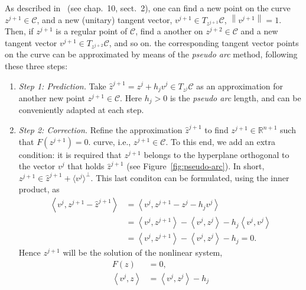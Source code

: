 \documentclass[11pt,reqno,twoside]{article}
\newcommand{\R}{\ensuremath{\mathbb{R}}}
\theoremstyle{remark}
\begin{document}
As described in~\cite{Kuznetsov2004} (see chap.~10, sect.~2), one can
find a new point on the curve $z^{j+1}\in\mathcal{C}$, and a new (unitary) tangent
vector, $v^{j+1}\in T_{z^{j+1}}\mathcal{C}$, $\left\|v^{j+1}\right\| = 1$.
Then, if $z^{j+1}$ is a
regular point of $\mathcal{C}$, find a another on $z^{j+2}\in\mathcal{C}$
and a new tangent vector $v^{j+1}\in T_{z^{j+2}}\mathcal{C}$, and so on.   
the corresponding tangent vector
points on the curve can be approximated by means of the \emph{pseudo arc} method, following
these three steps:
\begin{enumerate}[label = \emph{\arabic*.}]
  \item \emph{Step 1: Prediction.} Take $\hat{z}^{j+1} = z^{j} + h_{j}
    v^{j}\in T_{z^{j}}\mathcal{C}$ as an approximation for another new
    point $z^{j+1}\in\mathcal{C}$. Here $h_{j} > 0$ is the \emph{pseudo
    arc} length, and can be conveniently adapted at each step.
  \item \emph{Step 2: Correction.} Refine the approximation $\hat{z}^{j+1}$
    to find $z^{j+1}\in\R^{n+1}$ such that $F\left(z^{j+1}\right) = 0$. 
    curve, i.e., $z^{j+1}\in\mathcal{C}$. To this end, we add an 
    extra condition: 
    it is required that $z^{j+1}$ belongs to
    the hyperplane orthogonal to the vector $v^{j}$ that holds
    $\hat{z}^{j+1}$ (see Figure~\ref{fig:pseudo-arc}). In short, $z^{j+1}\in\hat{z}^{j+1} +
    \langle v^{j}\rangle^{\perp}$. This last conditon can be formulated,
    using the inner product, as
    \begin{align*}
      \left\langle v^{j}, z^{j+1} - \hat{z}^{j+1}\right\rangle &=  
      \left\langle v^{j}, z^{j+1} - z^{j} - h_{j} v^{j}\right\rangle \\
      &= \left\langle v^{j}, z^{j+1}\right\rangle -
        \left\langle v^{j}, z^{j}\right\rangle - 
        h_{j} \left\langle v^{j}, v^{j}\right\rangle\\
      &=  \left\langle v^{j}, z^{j+1}\right\rangle -
          \left\langle v^{j}, z^{j}\right\rangle - h_{j} = 0.
    \end{align*}
    Hence $z^{j+1}$ will be the solution of the nonlinear system,
    \begin{displaymath}
      \begin{split}%
        F(z) &= 0,\\
        \left\langle v^{j}, z\right\rangle &= \left\langle v^{j},
        z^{j}\right\rangle - h_{j}
        \end{split}
    \end{displaymath}

\end{enumerate}
\end{document}
